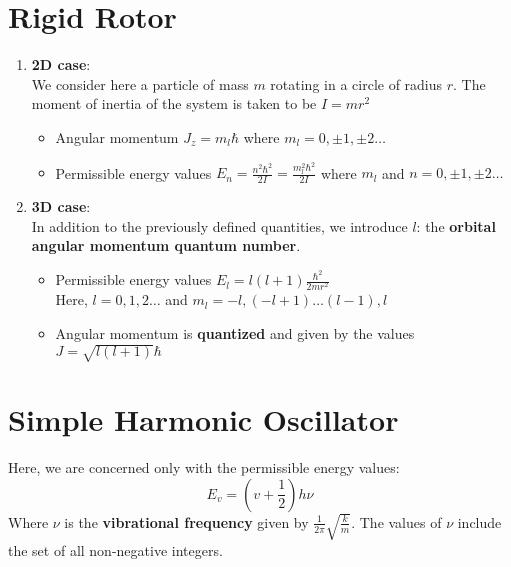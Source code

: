 \documentclass[a4paper]{article}
\begin{document}
\section{Rigid Rotor}
\begin{enumerate}
    \item \textbf{2D case}:\\
    We consider here a particle of mass $m$ rotating in a circle of radius $r$. The moment of inertia of the system is taken to be $I = mr^2$
    \begin{itemize}
        \item Angular momentum $J_z = m_l\hbar$ where $m_l = 0, \pm 1, \pm 2
        \dots$ 
        \item Permissible energy values $E_n = \frac{n^2\hbar^2}{2I} = \frac{m_l^2\hbar^2}{2I}$ where $m_l$ and $n = 0, \pm 1, \pm 2
        \dots$ 
    \end{itemize}
    
    \item \textbf{3D case}:\\
    In addition to the previously defined quantities, we introduce $l$: the \textbf{orbital angular momentum quantum number}.
    \begin{itemize}
        \item Permissible energy values $E_l = l(l+1)\frac{\hbar^2}{2mr^2}$\\
        Here, $l = 0,1,2\dots$ and $m_l = -l,(-l+1)\dots(l-1), l$
        \item Angular momentum is \textbf{quantized} and given by the values $J = \sqrt{l(l+1)}\hbar$
    \end{itemize}
\end{enumerate}

\section{Simple Harmonic Oscillator}
Here, we are concerned only with the permissible energy values:
\begin{equation*}
    E_v = \left(v+\frac{1}{2}\right)h\nu
\end{equation*}
Where $\nu$ is the \textbf{vibrational frequency} given by $\frac{1}{2\pi}\sqrt{\frac{k}{m}}$. The values of $\nu$ include the set of all non-negative integers.
\end{document}
